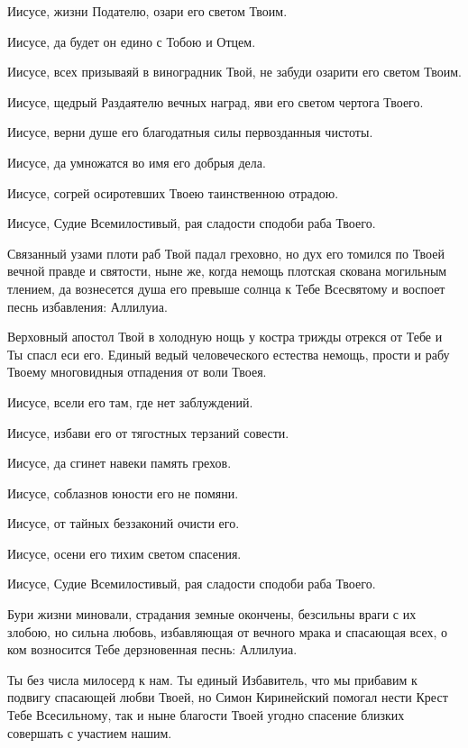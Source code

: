 \begin{mymulticols}
Иисусе, жизни Подателю, озари его светом Твоим. 

Иисусе, да будет он едино с Тобою и Отцем. 

Иисусе, всех призываяй в виноградник Твой, не забуди озарити его светом Твоим. 

Иисусе, щедрый Раздаятелю вечных наград, яви его светом чертога Твоего. 

Иисусе, верни душе его благодатныя силы первозданныя чистоты. 

Иисусе, да умножатся во имя его добрыя дела. 

Иисусе, согрей осиротевших Твоею таинственною отрадою. 

Иисусе, Судие Всемилостивый, рая сладости сподоби раба Твоего.


Связанный узами плоти раб Твой падал греховно, но дух его томился по Твоей вечной правде и святости, ныне же, когда немощь плотская скована могильным тлением, да вознесется душа его превыше солнца к Тебе Всесвятому и воспоет песнь избавления: Аллилуиа.


Верховный апостол Твой в холодную нощь у костра трижды отрекся от Тебе и Ты спасл еси его. Единый ведый человеческого естества немощь, прости и рабу Твоему  многовидныя отпадения от воли Твоея. 

Иисусе, всели его там, где нет заблуждений. 

Иисусе, избави его от тягостных терзаний совести. 

Иисусе, да сгинет навеки память грехов. 

Иисусе, соблазнов юности его не помяни. 

Иисусе, от тайных беззаконий очисти его. 

Иисусе, осени его тихим светом спасения. 

Иисусе, Судие Всемилостивый, рая сладости сподоби раба Твоего.


Бури жизни миновали, страдания земные окончены, безсильны враги с их злобою, но сильна любовь, избавляющая от вечного мрака и спасающая всех, о ком возносится Тебе дерзновенная песнь: Аллилуиа.


Ты без числа милосерд к нам. Ты единый Избавитель, что мы прибавим к подвигу спасающей любви Твоей, но Симон Киринейский помогал нести Крест Тебе Всесильному, так и ныне благости Твоей угодно спасение близких совершать с участием нашим. 


\end{mymulticols}
